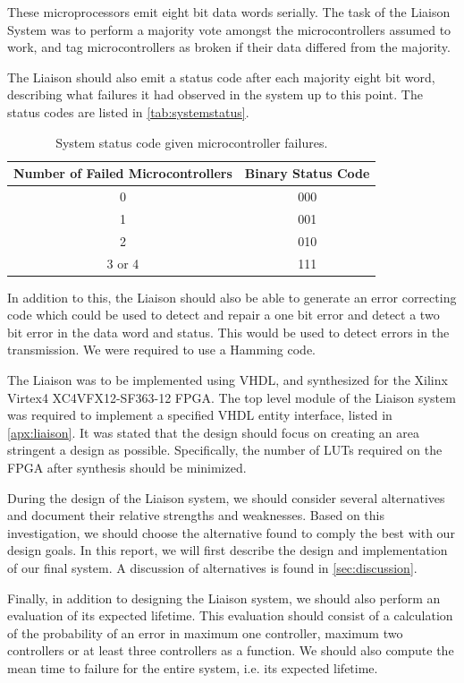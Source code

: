 These microprocessors emit eight bit data words serially. The task of
the Liaison System was to perform a majority vote amongst the
microcontrollers assumed to work, and tag microcontrollers as broken
if their data differed from the majority.

The Liaison should also emit a status code after each majority eight
bit word, describing what failures it had observed in the system up to
this point. The status codes are listed in \autoref{tab:systemstatus}.

\begin{table}[htbp]
  \centering
  \begin{tabular}{|c|c|}
    \hline
    \textbf{Number of Failed Microcontrollers} & \textbf{Binary Status Code} \\ \hline
    0 & 000 \\ \hline
    1 & 001 \\ \hline
    2 & 010 \\ \hline
    3 or 4 & 111 \\ \hline
  \end{tabular}
  \caption{System status code given microcontroller failures.}
  \label{tab:systemstatus}
\end{table}

In addition to this, the Liaison should also be able to generate an
error correcting code which could be used to detect and repair a one
bit error and detect a two bit error in the data word and status. This
would be used to detect errors in the transmission. We were required
to use a Hamming code\cite{task}\cite{ecc}.

The Liaison was to be implemented using VHDL, and synthesized for the
Xilinx Virtex4 XC4VFX12-SF363-12 FPGA. The top level module of the
Liaison system was required to implement a specified VHDL entity
interface, listed in \autoref{apx:liaison}. It was stated that the
design should focus on creating an area stringent a design as
possible. Specifically, the number of LUTs required on the FPGA after
synthesis should be minimized.

During the design of the Liaison system, we should consider several
alternatives and document their relative strengths and
weaknesses. Based on this investigation, we should choose the
alternative found to comply the best with our design goals. In this
report, we will first describe the design and implementation of our
final system. A discussion of alternatives is found in
\autoref{sec:discussion}.

Finally, in addition to designing the Liaison system, we should also
perform an evaluation of its expected lifetime. This evaluation should
consist of a calculation of the probability of an error in maximum one
controller, maximum two controllers or at least three controllers as a
function. We should also compute the mean time to failure for the
entire system, i.e. its expected lifetime.
